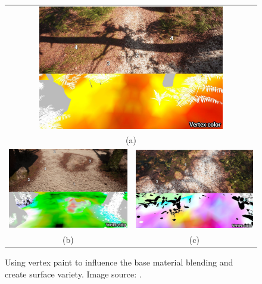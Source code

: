\begin{figure}
	\centering\small 
	\begin{tabular}{@{}cc@{}} %
		\multicolumn{2}{c}{\includegraphics[width=0.75\textwidth]{images/07cha_25_layeredLitUnity_vertex01.jpg}} \\
		\multicolumn{2}{c}{(a)} \\[6pt]	%
		\includegraphics[width=.475\textwidth]{images/07cha_25_layeredLitUnity_vertex02.jpg} &
		\includegraphics[width=.475\textwidth]{images/07cha_25_layeredLitUnity_vertex03.jpg} 
		\\
		(b) & (c) 
	\end{tabular}
	
	\caption{Using vertex paint to influence the base material blending and create surface variety. Image source: \cite[p.\,31--32]{unity2017photogrammetryLayered}.}
	\label{fig:vertexColor}
\end{figure}


